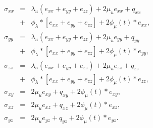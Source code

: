 \documentclass[11pt]{article}
\begin{document}
%
\begin{eqnarray}
  \sigma_{xx} & = & \lambda_u \left (e_{xx} + e_{yy} + e_{zz}\right)
                                   + 2\mu_u e_{xx} +q_{xx}         \nonumber\\  
              & + & \phi_{\lambda}*[e_{xx}+e_{yy}+e_{zz}] 
                                    + 2\phi_{\mu}(t)*e_{xx},       \nonumber\\
  \sigma_{yy} & = & \lambda_u \left (e_{xx} + e_{yy} + e_{zz}\right)
                                    + 2\mu_u e_{yy} +q_{yy}        \nonumber\\ 
              & + & \phi_{\lambda}*[e_{xx}+e_{yy}+e_{zz}] 
                                    + 2\phi_{\mu}(t)*e_{yy},       \nonumber\\
  \sigma_{zz} & = & \lambda_u \left (e_{xx} + e_{yy} + e_{zz}\right)
                                    + 2\mu_u e_{zz} +q_{zz}        \nonumber\\ 
              & + & \phi_{\lambda}*[e_{xx}+e_{yy}+e_{zz}] 
                                    + 2\phi_{\mu}(t)*e_{zz},       \nonumber\\
  \sigma_{xy} & = & 2\mu_u e_{xy} +q_{xy} + 2\phi_{\mu}(t)*e_{xy}, \nonumber\\
  \sigma_{xz} & = & 2\mu_u e_{xz} +q_{xz} + 2\phi_{\mu}(t)*e_{xz}, \nonumber\\
  \sigma_{yz} & = & 2\mu_u e_{yz} +q_{yz}+  2\phi_{\mu}(t)*e_{yz}. \nonumber\\
\end{eqnarray}
%
\end{document}
